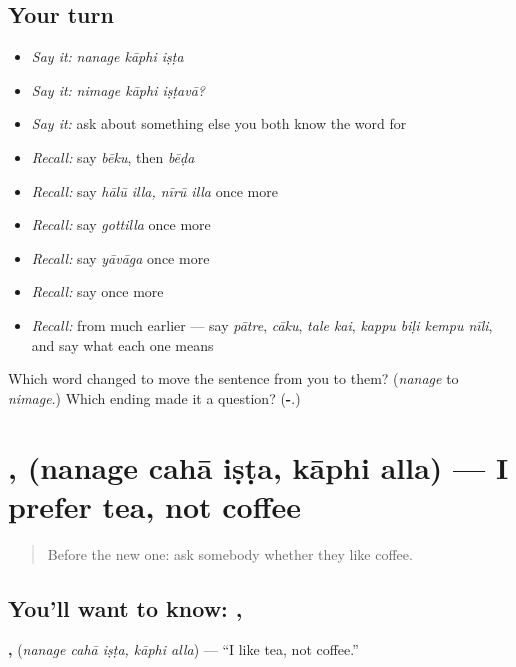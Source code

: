 \subsection*{Your turn}
\begin{itemize}
\raggedright
  \item \emph{Say it:} \emph{nanage kāphi iṣṭa}
  \item \emph{Say it:} \emph{nimage kāphi iṣṭavā?}
  \item \emph{Say it:} ask about something else you both know the word for
  \item \emph{Recall:} say \emph{bēku}, then \emph{bēḍa}
  \item \emph{Recall:} say \emph{hālū illa, nīrū illa} once more
  \item \emph{Recall:} say \emph{gottilla} once more
  \item \emph{Recall:} say \emph{yāvāga} once more
  \item \emph{Recall:} say \emph{} once more
  \item \emph{Recall:} from much earlier — say \emph{pātre}, \emph{cāku}, \emph{tale kai}, \emph{kappu biḷi kempu nīli}, and say what each one means
\end{itemize}

\begin{tcolorbox}[breakable,colback=teal!4,colframe=teal!35!black,title={Before you move on}]
Which word changed to move the sentence from you to them? (\emph{nanage} to \emph{nimage}.) Which ending made it a question? (\textbf{-}.)
\end{tcolorbox}
\section[\texorpdfstring{\kn{ನನಗೆ} \kn{ಚಹಾ} \kn{ಇಷ್ಟ}, \kn{ಕಾಫಿ} … (nanage cahā …)}{ನನಗೆ ಚಹಾ ಇಷ್ಟ, ಕಾಫಿ … (nanage cahā …)}]{  ,   (nanage cahā iṣṭa, kāphi alla) — I prefer tea, not coffee}

\label{lesson:KA-C72-prefer}



\begin{quote}
Before the new one: ask somebody whether they like coffee.
\end{quote}

\subsection*{You'll want to know:   ,  }
\textbf{  ,  } (\emph{nanage cahā iṣṭa, kāphi alla}) — \textquotedblleft{}I like tea, not coffee.\textquotedblright{}


